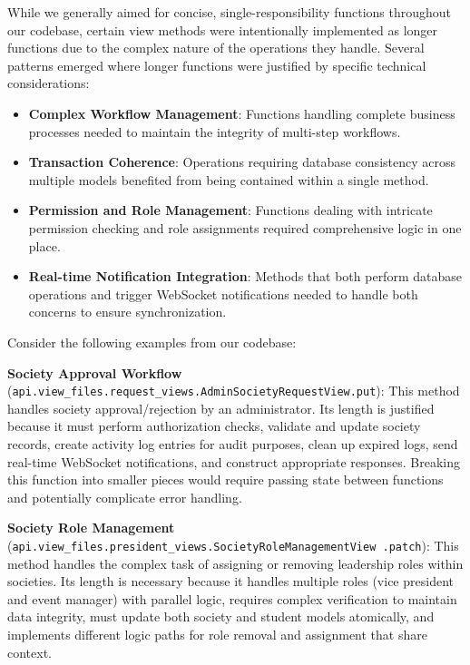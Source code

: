 While we generally aimed for concise, single-responsibility functions throughout our codebase, certain view methods were intentionally implemented as longer functions due to the complex nature of the operations they handle. Several patterns emerged where longer functions were justified by specific technical considerations:

\begin{itemize}
    \item \textbf{Complex Workflow Management}: Functions handling complete business processes needed to maintain the integrity of multi-step workflows.
    
    \item \textbf{Transaction Coherence}: Operations requiring database consistency across multiple models benefited from being contained within a single method.
    
    \item \textbf{Permission and Role Management}: Functions dealing with intricate permission checking and role assignments required comprehensive logic in one place.
    
    \item \textbf{Real-time Notification Integration}: Methods that both perform database operations and trigger WebSocket notifications needed to handle both concerns to ensure synchronization.
\end{itemize}

Consider the following examples from our codebase:

\textbf{Society Approval Workflow} (\texttt{api.view\_files.request\_views.AdminSocietyRequestView.put}):
This method handles society approval/rejection by an administrator. Its length is justified because it must perform authorization checks, validate and update society records, create activity log entries for audit purposes, clean up expired logs, send real-time WebSocket notifications, and construct appropriate responses. Breaking this function into smaller pieces would require passing state between functions and potentially complicate error handling.

\textbf{Society Role Management} (\texttt{api.view\_files.president\_views.SocietyRoleManagementView
.patch}):
This method handles the complex task of assigning or removing leadership roles within societies. Its length is necessary because it handles multiple roles (vice president and event manager) with parallel logic, requires complex verification to maintain data integrity, must update both society and student models atomically, and implements different logic paths for role removal and assignment that share context.

